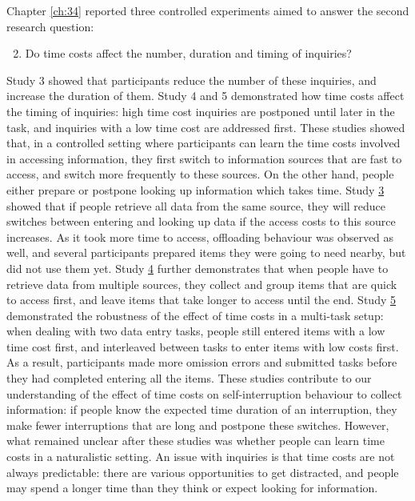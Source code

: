 Chapter \ref{ch:34} reported three controlled experiments aimed to answer the second research question:

\begin{enumerate}
\setcounter{enumi}{1}
\item
Do time costs affect the number, duration and timing of inquiries? 
\end{enumerate}

Study 3 showed that participants reduce the number of these inquiries, and increase the duration of them. Study 4 and 5 demonstrated how time costs affect the timing of inquiries: high time cost inquiries are postponed until later in the task, and inquiries with a low time cost are addressed first.
These studies showed that, in a controlled setting where participants can learn the time costs involved in accessing information, they first switch to information sources that are fast to access, and switch more frequently to these sources. On the other hand, people either prepare or postpone looking up information which takes time. Study \hyperref[st:Study3]{3} showed that if people retrieve all data from the same source, they will reduce switches between entering and looking up data if the access costs to this source increases. As it took more time to access, offloading behaviour was observed as well, and several participants prepared items they were going to need nearby, but did not use them yet. Study \hyperref[st:Study4]{4} further demonstrates that when people have to retrieve data from multiple sources, they collect and group items that are quick to access first, and leave items that take longer to access until the end. Study \hyperref[st:Study5]{5} demonstrated the robustness of the effect of time costs in a multi-task setup: when dealing with two data entry tasks, people still entered items with a low time cost first, and interleaved between tasks to enter items with low costs first. As a result, participants made more omission errors and submitted tasks before they had completed entering all the items. These studies contribute to our understanding of the effect of time costs on self-interruption behaviour to collect information: if people know the expected time duration of an interruption, they make fewer interruptions that are long and postpone these switches. However, what remained unclear after these studies was whether people can learn time costs in a naturalistic setting. An issue with inquiries is that time costs are not always predictable: there are various opportunities to get distracted, and people may spend a longer time than they think or expect looking for information.

